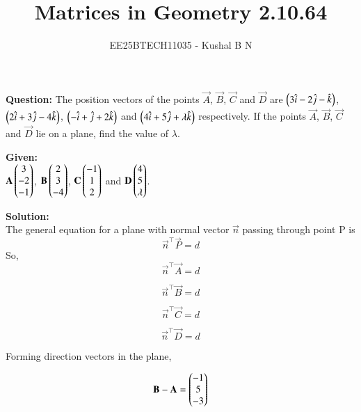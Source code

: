 \documentclass[journal,12pt,onecolumn]{IEEEtran}
\title{Matrices in Geometry 2.10.64}
\author{EE25BTECH11035 - Kushal B N}
\theoremstyle{remark}
\begin{document}
\vspace{3cm}
\maketitle
{\let\newpage\relax\maketitle}
\textbf{Question: }
The position vectors of the points $\vec{A}$, $\vec{B}$, $\vec{C}$ and $\vec{D}$ are $\left(3\hat{i}-2\hat{j}-\hat{k}\right)$, $\left(2\hat{i}+3\hat{j}-4\hat{k}\right)$, $\left(-\hat{i}+\hat{j}+2\hat{k}\right)$ and $\left(4\hat{i}+5\hat{j}+\lambda\hat{k}\right)$ respectively. If the points $\vec{A}$, $\vec{B}$, $\vec{C}$ and $\vec{D}$ lie on a plane, find the value of $\lambda$.
\bigskip

\textbf{Given: } \\
$\mathbf{A}\begin{pmatrix}3\\-2\\-1\end{pmatrix}$, $\mathbf{B}\begin{pmatrix}2\\3\\-4\end{pmatrix}$, $\mathbf{C}\begin{pmatrix}-1\\1\\2\end{pmatrix}$ and $\mathbf{D}\begin{pmatrix}4\\5\\\lambda\end{pmatrix}$.
\bigskip

\textbf{Solution: }\\

The general equation for a plane with normal vector $\vec{n}$ passing through point P is \\
\begin{equation}
    \vec{n}^{\top}\vec{P} = d
\end{equation}
So,
\begin{equation}
    \vec{n}^{\top}\vec{A} = d
\end{equation}

\begin{equation}
    \vec{n}^{\top}\vec{B} = d
\end{equation}

\begin{equation}
    \vec{n}^{\top}\vec{C} = d
\end{equation}

\begin{equation}
    \vec{n}^{\top}\vec{D} = d
\end{equation}

Forming direction vectors in the plane,

\begin{equation}
\mathbf{B} - \mathbf{A} = \begin{pmatrix}-1\\5\\-3\end{pmatrix}
\end{equation}
\end{document}
